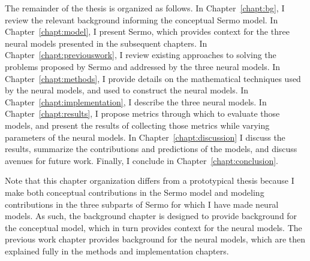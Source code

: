 The remainder of the thesis is organized as follows.
In Chapter~\ref{chapt:bg},
I review the relevant background informing
the conceptual Sermo model.
In Chapter~\ref{chapt:model},
I present Sermo,
which provides context for
the three neural models presented
in the subsequent chapters.
In Chapter~\ref{chapt:previouswork},
I review existing approaches
to solving the problems
proposed by Sermo
and addressed by the three neural models.
In Chapter~\ref{chapt:methods},
I provide details on the
mathematical techniques
used by the neural models,
and used to construct the neural models.
In Chapter~\ref{chapt:implementation},
I describe the three neural models.
In Chapter~\ref{chapt:results},
I propose metrics through which
to evaluate those models,
and present the results of collecting those metrics
while varying parameters of the neural models.
In Chapter~\ref{chapt:discussion}
I discuss the results,
summarize the contributions and predictions
of the models,
and discuss avenues for future work.
Finally, I conclude in Chapter~\ref{chapt:conclusion}.

Note that this chapter organization differs
from a prototypical thesis
because I make both
conceptual contributions
in the Sermo model
and modeling contributions
in the three subparts of Sermo
for which I have made neural models.
As such, the background chapter is designed
to provide background for the conceptual model,
which in turn provides context
for the neural models.
The previous work chapter provides
background for the neural models,
which are then explained fully
in the methods and implementation chapters.

